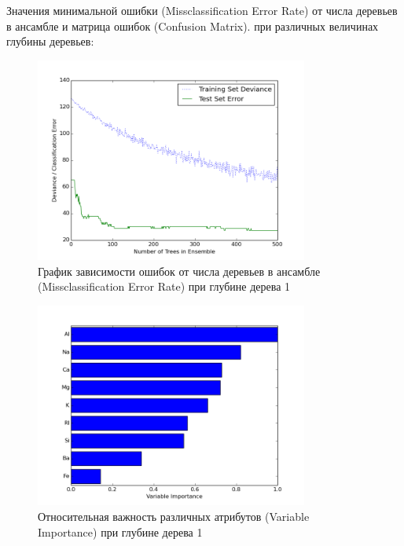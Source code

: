 \documentclass{article} %
\begin{document}
Значения минимальной ошибки (Missclassification Error Rate)
от числа деревьев в ансамбле и матрица ошибок (Confusion Matrix).
при различных величинах глубины деревьев:


\begin{figure}[H]
    \centering
    \includegraphics[width=0.8\textwidth]{perfGB1depth.png}
    \caption{График зависимости ошибок от числа деревьев в ансамбле
    (Missclassification Error Rate) при глубине дерева 1}
\end{figure}

\begin{figure}[H]
    \centering
    \includegraphics[width=0.8\textwidth]{varImpBG1depth}
    \caption{Относительная важность различных атрибутов
    (Variable Importance) при глубине дерева 1}
\end{figure}
\end{document}
